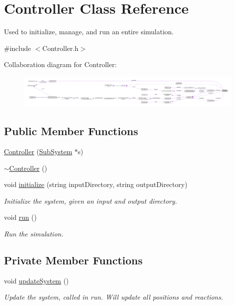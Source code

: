 \hypertarget{classController}{\section{Controller Class Reference}
\label{classController}
}


Used to initialize, manage, and run an entire simulation.  




{\ttfamily \#include $<$Controller.\+h$>$}



Collaboration diagram for Controller\+:
\nopagebreak
\begin{figure}[H]
\begin{center}
\leavevmode
\includegraphics[width=350pt]{classController__coll__graph}
\end{center}
\end{figure}
\subsection*{Public Member Functions}
\begin{DoxyCompactItemize}
\item 
\hyperlink{classController_ab2466b5e31e9a19431fe36fa955fa8df}{Controller} (\hyperlink{classSubSystem}{Sub\+System} $\ast$s)
\item 
\hyperlink{classController_a0ab87934c4f7a266cfdb86e0f36bc1b5}{$\sim$\+Controller} ()
\item 
void \hyperlink{classController_a951b2e6eeec2ca5a966f4a84bfc7c7d1}{initialize} (string input\+Directory, string output\+Directory)
\begin{DoxyCompactList}\small\item\em Initialize the system, given an input and output directory. \end{DoxyCompactList}\item 
void \hyperlink{classController_a692f0f5dc600cdcb79786a31cf283ce1}{run} ()
\begin{DoxyCompactList}\small\item\em Run the simulation. \end{DoxyCompactList}\end{DoxyCompactItemize}
\subsection*{Private Member Functions}
\begin{DoxyCompactItemize}
\item 
void \hyperlink{classController_a5e23fe755f10aa6437d6eaccf4ec1ee1}{update\+System} ()
\begin{DoxyCompactList}\small\item\em Update the system, called in run. Will update all positions and reactions. \end{DoxyCompactList}\end{DoxyCompactItemize}
